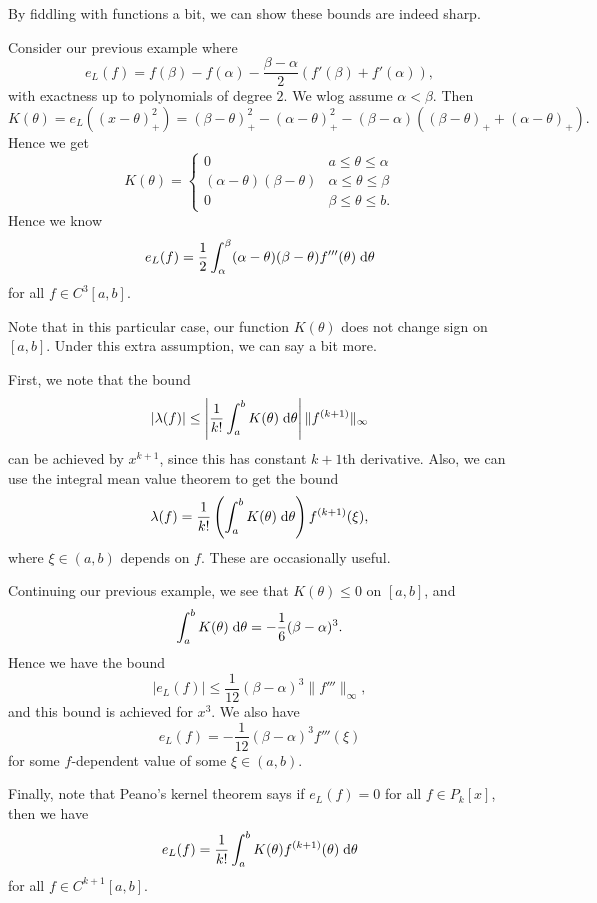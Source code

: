 \documentclass[a4paper]{article}
\begin{document}
By fiddling with functions a bit, we can show these bounds are indeed sharp.

\begin{eg}
  Consider our previous example where
  \[
    e_L(f) = f(\beta) - f(\alpha) - \frac{\beta - \alpha}{2} (f'(\beta) + f'(\alpha)),
  \]
  with exactness up to polynomials of degree $2$. We wlog assume $\alpha < \beta$. Then
  \[
    K(\theta) = e_L((x - \theta)_+^2) = (\beta - \theta)_+^2 - (\alpha - \theta)_+^2 - (\beta - \alpha)((\beta - \theta)_+ + (\alpha - \theta)_+).
  \]
  Hence we get
  \[
    K(\theta) =
    \begin{cases}
      0 & a \leq \theta \leq \alpha\\
      (\alpha - \theta)(\beta - \theta) & \alpha \leq \theta \leq \beta\\
      0 & \beta \leq \theta \leq b.
    \end{cases}
  \]
  Hence we know
  \[
    e_L(f) = \frac{1}{2}\int_\alpha^\beta (\alpha - \theta)(\beta - \theta) f'''(\theta) \;\mathrm{d} \theta
  \]
  for all $f \in C^3[a, b]$.
\end{eg}

Note that in this particular case, our function $K(\theta)$ does not change sign on $[a, b]$. Under this extra assumption, we can say a bit more.

First, we note that the bound
\[
  |\lambda(f)| \leq \left|\frac{1}{k!} \int_a^b K(\theta) \;\mathrm{d} \theta\right| \|f^{(k + 1)}\|_\infty
\]
can be achieved by $x^{k + 1}$, since this has constant $k + 1$th derivative. Also, we can use the integral mean value theorem to get the bound
\[
  \lambda (f) = \frac{1}{k!} \left(\int_a^b K(\theta)\;\mathrm{d} \theta\right) f^{(k + 1)}(\xi),
\]
where $\xi \in (a, b)$ depends on $f$. These are occasionally useful.

\begin{eg}
  Continuing our previous example, we see that $K(\theta) \leq 0$ on $[a, b]$, and
  \[
    \int_a^b K(\theta)\;\mathrm{d} \theta = -\frac{1}{6}(\beta - \alpha)^3.
  \]
  Hence we have the bound
  \[
    |e_L(f)| \leq \frac{1}{12}(\beta - \alpha)^3 \|f'''\|_{\infty},
  \]
  and this bound is achieved for $x^3$. We also have
  \[
    e_L(f) = -\frac{1}{12}(\beta - \alpha)^3 f'''(\xi)
  \]
  for some $f$-dependent value of some $\xi \in (a, b)$.
\end{eg}

Finally, note that Peano's kernel theorem says if $e_L(f) = 0$ for all $f \in P_k[x]$, then we have
\[
  e_L(f) = \frac{1}{k!} \int_a^b K(\theta) f^{(k + 1)}(\theta)\;\mathrm{d} \theta
\]
for all $f \in C^{k + 1}[a, b]$.
\end{document}
